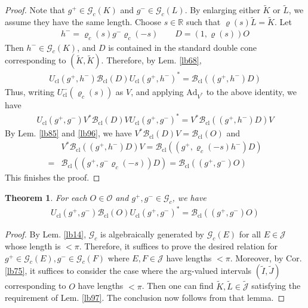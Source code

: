 \documentclass[11pt,b5paper,notitlepage]{article}
\theoremstyle{definition}
\theoremstyle{plain}
\newtheorem{thm}[df]{Theorem}
\newcommand{\wtd}{\widetilde}
\newcommand{\Jtd}{\widetilde{\mathcal J}}
\newcommand{\Ad}{\mathrm{Ad}}
\newcommand{\Rbb}{\mathbb R}
\newcommand{\Gc}{\mathscr G_c}
\newcommand{\cl}{\mathrm{cl}}
\newcommand{\MJ}{\mathcal J}
\newcommand{\MO}{\mathcal O}
\newcommand{\Bcl}{\mathcal B_{\mathrm{cl}}}
\newcommand{\Ucl}{U_{\mathrm{cl}}}
\numberwithin{equation}{section}
\begin{document}
\begin{proof}
Note that $g^+\in\Gc(K)$ and $g^-\in\Gc(L)$. By enlarging either $\wtd K$ or $\wtd L$, we assume they have the same length. Choose $s\in\Rbb$ such that $\varrho(s)\wtd L=\wtd K$. Let
\begin{align*}
h^-=\varrho_c(s)g^-\varrho_c(-s)\qquad D=(1,\varrho(s))O
\end{align*}
Then $h^-\in\Gc(K)$, and $D$ is contained in the standard double cone corresponding to $(\wtd K,\wtd K)$. Therefore, by Lem. \ref{lb68},
\begin{align*}
\Ucl(g^+,h^-)\Bcl(D)\Ucl(g^+,h^-)^*=\Bcl((g^+,h^-)D)
\end{align*}
Thus, writing $\Ucl^-(\varrho_c(s))$ as $V$, and applying $\Ad_{V^*}$ to the above identity, we have
\begin{align*}
\Ucl(g^+,g^-)V^*\Bcl(D)V\Ucl(g^+,g^-)^*=V^*\Bcl((g^+,h^-)D)V
\end{align*}
By Lem. \ref{lb85} and \ref{lb96}, we have $V^*\Bcl(D)V=\Bcl(O)$ and
\begin{align*}
&V^*\Bcl((g^+,h^-)D)V=\Bcl((g^+,\varrho_c(-s)h^-)D)\\
=&\Bcl((g^+,g^-\varrho_c(-s))D)=\Bcl((g^+,g^-)O)
\end{align*}
This finishes the proof.
\end{proof}









\begin{thm}\label{lb98}
For each $O\in\MO$ and $g^+,g^-\in\Gc$, we have
\begin{align*}
\Ucl(g^+,g^-)\Bcl(O)U_\cl(g^+,g^-)^*=\Bcl((g^+,g^-)O)
\end{align*}
\end{thm}


\begin{proof}
By Lem. \ref{lb14}, $\Gc$ is algebraically generated by $\Gc(E)$ for all $E\in\MJ$ whose length is $<\pi$. Therefore, it suffices to prove the desired relation for $g^+\in\Gc(E),g^-\in\Gc(F)$ where $E,F\in\MJ$ have lengths $<\pi$. Moreover, by Cor. \ref{lb75}, it suffices to consider the case where the arg-valued intervals $(\wtd I,\wtd J)$ corresponding to $O$ have lengths $<\pi$. Then one can find $\wtd K,\wtd L\in\Jtd$ satisfying the requirement of Lem. \ref{lb97}. The conclusion now follows from that lemma.
\end{proof}
\end{document}
